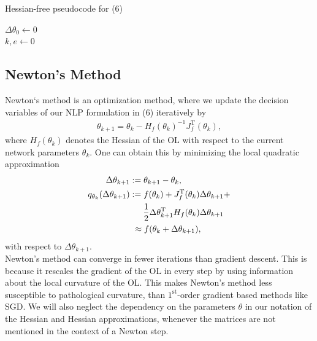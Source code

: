 \documentclass[conference]{IEEEtran}
\begin{document}
	\begin{algorithm}
		\caption{Hessian-free pseudocode for (6)}\label{alg:two}
		$\Delta\theta_{0}\gets 0$\\
		$k, e\gets 0$\\
		\KwOut{$\theta^{\star}$}
	\end{algorithm}
	\subsection{Newton's Method}
	\noindent
	Newton`s method is an optimization method, where we update the decision variables of our NLP formulation in (6) iteratively by
	\begin{align}
	\theta_{k+1} = \theta_{k} -H_{f}(\theta_{k})^{-1} J_{f}^{\mathrm{T}}(\theta_{k}),
	\end{align}
	where $H_{f}(\theta_{k})$ denotes the Hessian of the OL with respect to the current network parameters $\theta_{k}$. One can obtain this by minimizing the local quadratic approximation
	\begin{align}
	\text{ }\Delta\theta_{k+1} &:= \theta_{k+1} - \theta_{k},\\
	q_{\theta_{k}}(\Delta\theta_{k+1})&:= f(\theta_{k}) + J_{f}^{\mathrm{T}}(\theta_{k})\Delta\theta_{k+1} + \notag\\
	&\:\:\:\:\:\:\:\frac{1}{2}\Delta\theta_{k+1}^{\mathrm{T}}H_{f}(\theta_{k})\Delta\theta_{k+1}\\
	&\text{ }\approx f(\theta_{k} + \Delta\theta_{k+1}),
	\end{align}
	with respect to $\Delta\theta_{k+1}$. \\
	Newton's method can converge in fewer iterations than gradient descent. This is because it rescales the gradient of the OL in every step by using information about the local curvature of the OL. This makes Newton's method less susceptible to pathological curvature, than $1^{\text{st}}$-order gradient based methods like SGD. We will also neglect the dependency on the parameters $\theta$ in our notation of the Hessian and Hessian approximations, whenever the matrices are not mentioned in the context of a Newton step.
\end{document}
